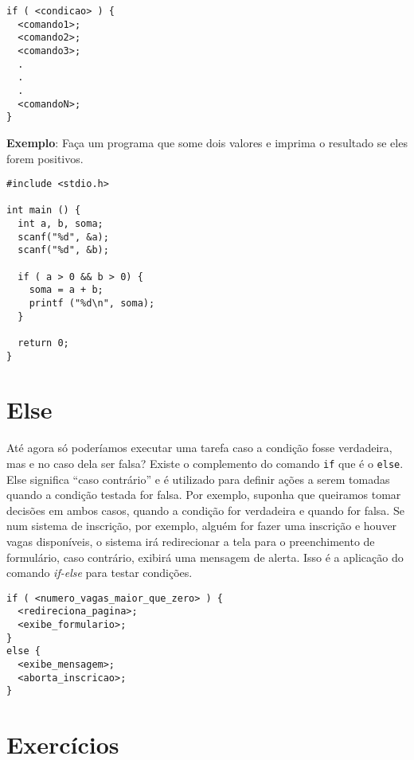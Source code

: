 \begin{lstlisting}[label=comandoIf,caption=Exemplo múltiplos comandos]
if ( <condicao> ) {
  <comando1>;
  <comando2>;
  <comando3>;
  .
  .
  .
  <comandoN>;
}
\end{lstlisting}

\textbf{Exemplo}:
  Faça um programa que some dois valores e imprima o resultado se eles forem positivos.

\begin{lstlisting}[label=comandoIf,caption=Exemplo múltiplos comandos]
#include <stdio.h>

int main () {
  int a, b, soma;
  scanf("%d", &a);  
  scanf("%d", &b);
  
  if ( a > 0 && b > 0) {
    soma = a + b;
    printf ("%d\n", soma);
  }
  
  return 0;
}
\end{lstlisting}

\section{Else}
Até agora só poderíamos executar uma tarefa caso a condição fosse verdadeira, mas e no caso dela ser falsa? Existe o complemento do comando {\tt if} que é o {\tt else}. Else significa ``caso contrário'' e é utilizado para definir ações a serem tomadas quando a condição testada for falsa.
Por exemplo, suponha que queiramos tomar decisões em ambos casos, quando a condição for verdadeira e quando for falsa. Se num sistema de inscrição, por exemplo, alguém for fazer uma inscrição e houver vagas disponíveis, o sistema irá redirecionar a tela para o preenchimento de formulário, caso contrário, exibirá uma mensagem de alerta. Isso é a aplicação do comando \textit{if-else} para testar condições.

\begin{lstlisting}[label=comandoIf,caption=Exemplo com else]
if ( <numero_vagas_maior_que_zero> ) {
  <redireciona_pagina>;
  <exibe_formulario>;
}
else {
  <exibe_mensagem>;
  <aborta_inscricao>;
}
\end{lstlisting}

\newpage
\section{Exercícios}

